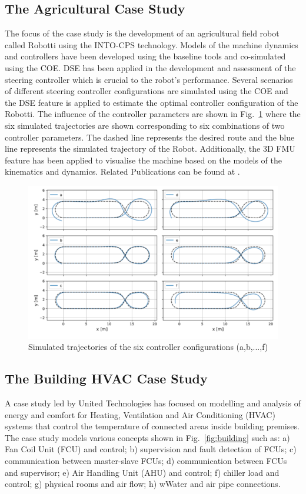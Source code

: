 \subsection{The Agricultural Case Study}

The focus of the case study is the development of an agricultural field robot called Robotti using the INTO-CPS technology. Models of the machine dynamics and controllers have been developed using the baseline tools and co-simulated using the COE. DSE has been applied in the development and assessment of the steering controller which is crucial to the robot's performance. Several scenarios of different steering controller configurations are simulated using the COE and the DSE feature is applied to estimate the optimal controller configuration of the Robotti. The influence of the controller parameters are shown in Fig.~\ref{fig:agri} where the six simulated trajectories are shown corresponding to six combinations of two controller parameters. The dashed line represents the desired route and the blue line represents the simulated trajectory of the Robot. Additionally, the 3D FMU feature has been applied to visualise the machine based on the models of the kinematics and dynamics. 
Related Publications can be found at \cite{Foldager&17,Foldager&18}. 

\begin{figure}[!ht]
	\centering
		\includegraphics[width=0.9 \textwidth]{./figures/agri}
	\caption{Simulated trajectories of the six controller configurations (a,b,...,f)}
	\label{fig:agri}
\end{figure}

\subsection{The Building HVAC Case Study}
 A case study led by United Technologies has focused on modelling and analysis of energy and comfort for Heating, Ventilation and Air Conditioning (HVAC) systems that control the temperature of connected areas inside building premises. The case study models various concepts shown in Fig.~\ref{fig:building} such as: a) Fan Coil Unit (FCU) and control; b) supervision and fault detection of FCUs; c) communication between master-slave FCUs; d) communication between FCUs and supervisor; e) Air Handling Unit (AHU) and control; f) chiller load and control; g) physical rooms and air flow; h) wWater and air pipe connections.

